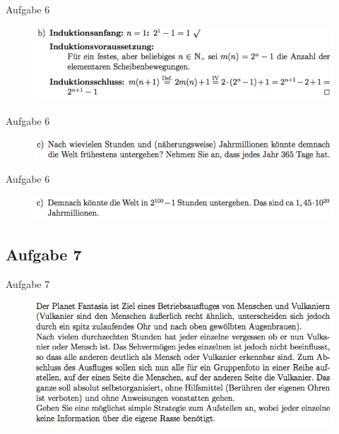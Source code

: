 \begin{frame}{Aufgabe 6}
\begin{figure}[h!]
		\centering
		\includegraphics[width=\textwidth]{15.png} 
	\end{figure}     
\end{frame}

\begin{frame}{Aufgabe 6}
\begin{figure}[h!]
		\centering
		\includegraphics[width=\textwidth]{16.png} 
	\end{figure}     
\end{frame}

\begin{frame}{Aufgabe 6}
\begin{figure}[h!]
		\centering
		\includegraphics[width=\textwidth]{17.png} 
	\end{figure}     
\end{frame}

\subsection{Aufgabe 7}
\begin{frame}{Aufgabe 7}
\begin{figure}[h!]
		\centering
		\includegraphics[width=\textwidth]{18.png} 
	\end{figure}     
\end{frame}


